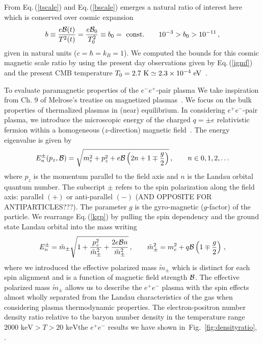 \documentclass[a4paper]{article}
\newcommand*{\keV}{\text{ keV}}
\newcommand*{\eV}{\text{ eV}}
\newcommand{\req}[1]{Eq.\,(\ref{#1})}
\newcommand{\rf}[1]{Fig.~{\ref{#1}}}
\begin{document}
From \req{tscale} and \req{bscale} emerges a natural ratio of interest here which is conserved over cosmic expansion 
\begin{align}
    \label{tbscale}
    b \equiv\frac{e{\cal B}(t)}{T^{2}(t)}=\frac{e{\cal B}_{0}}{T_{0}^{2}}\equiv b_0={\rm\ const.}\qquad10^{-3}>b_{0}>10^{-11}\,,
\end{align}
given in natural units ($c=\hbar=k_{B}=1$). We computed the bounds for this cosmic magnetic scale ratio by using the present day observations given by \req{igmf} and the present CMB temperature $T_{0}=2.7{\rm\ K}\simeq2.3\times10^{-4}\eV$~\cite{aghanim2018planck}.

To evaluate paramagnetic properties of the $e^-e^+$-pair plasma We take inspiration from Ch. 9 of Melrose's treatise on magnetized plasmas~\cite{melrose2008quantum}. We focus  on the bulk properties of thermalized plasmas in (near) equilibrium. In considering $e^{+}e^{-}$-pair plasma, we introduce the microscopic energy of the charged $q=\pm e$ relativistic fermion within a homogeneous ($z$-direction) magnetic field~\cite{steinmetz2018magnetic}. The energy eigenvalue is given by
\begin{align}
    \label{kgp}
    E^{\pm}_{n}(p_{z},{\cal B})=\sqrt{m_{e}^{2}+p_{z}^{2}+e{\cal B}\left(2n+1\mp\frac{g}{2}\right)}\,,\qquad n\in0,1,2,\ldots
\end{align}
where $p_{z}$ is the momentum parallel to the field axis and $n$ is the Landau orbital quantum number. The subscript $\pm$ refers to the spin polarization along the field axis: parallel $(+)$ or anti-parallel $(-)$ (AND OPPOSITE FOR ANTIPARTICLES???). The parameter $g$ is the gyro-magnetic ($g$-factor) of the particle. We rearrange \req{kgp} by pulling the spin dependency and the ground state Landau orbital into the mass writing
\begin{align}
    \label{effmass}
    E^{\pm}_{n}={\tilde m}_{\pm}\sqrt{1+\frac{p_{z}^{2}}{{\tilde m}_{\pm}^{2}}+\frac{2e{\cal B}n}{{\tilde m}_{\pm}^{2}}}\,,\qquad {\tilde m}_{\pm}^{2}=m_{e}^{2}+q{\cal B}\left(1\mp\frac{g}{2}\right)\,,
\end{align}
where we introduced the effective polarized mass ${\tilde m}_{\pm}$ which is distinct for each spin alignment and is a function of magnetic field strength ${\cal B}$. The effective polarized mass ${\tilde m}_{\pm}$ allows us to describe the $e^{+}e^{-}$ plasma with the spin effects almost wholly separated from the Landau characteristics of the gas when considering plasma thermodynamic properties.
 The electron-positron number density ratio relative to the baryon number density in the temperature range $2000\keV>T>20\keV$the  $e^{+}e^{-}$ results we have shown in~\rf{fig:densityratio},    . 
\end{document}
